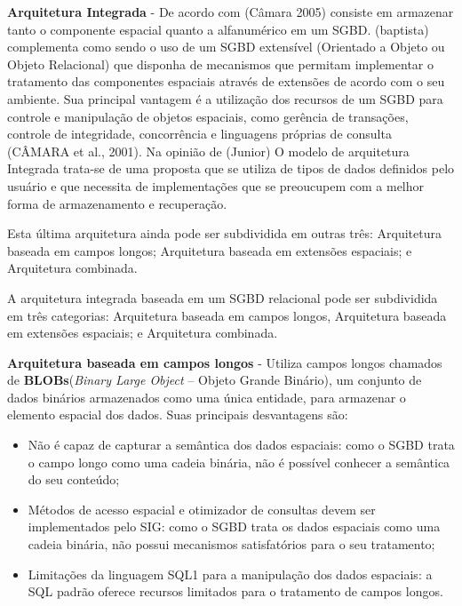 \documentclass[
	12pt,				%
    oneside,			%
	a4paper,			%
	english,			%
	french,				%
	spanish,			%
	brazil,				%
	]{abntex2}
\begin{document}
\textbf{Arquitetura Integrada} - De acordo com (Câmara 2005) consiste em armazenar tanto o componente espacial quanto a alfanumérico em um SGBD. (baptista) complementa como sendo o uso de um SGBD extensível (Orientado a Objeto ou Objeto Relacional) que disponha de mecanismos que permitam implementar o tratamento das componentes espaciais através de extensões de acordo com o seu ambiente. Sua principal vantagem é a utilização dos recursos de um SGBD para controle e manipulação de objetos espaciais, como gerência de transações, controle de integridade, concorrência e linguagens próprias de consulta (CÂMARA et al., 2001). Na opinião de (Junior) O modelo de arquitetura Integrada trata-se de uma proposta que se utiliza de tipos de dados definidos pelo usuário e que necessita de implementações que se preoucupem com a melhor forma de armazenamento e recuperação.

Esta última arquitetura ainda pode ser subdividida em outras três: Arquitetura baseada em campos longos; Arquitetura baseada em extensões espaciais; e Arquitetura combinada.

A arquitetura integrada baseada em um SGBD relacional pode ser subdividida em três categorias: Arquitetura baseada em campos longos, Arquitetura baseada em extensões espaciais; e Arquitetura combinada. 



\textbf{Arquitetura baseada em campos longos} - Utiliza campos longos chamados de \textbf{BLOBs}(\textit{Binary Large Object} – Objeto Grande Binário), um conjunto de dados binários armazenados como uma única entidade, para armazenar o elemento espacial dos dados.
 Suas principais desvantagens são:
 
 
\begin{itemize}
    \item Não é capaz de capturar a semântica dos dados espaciais: como o SGBD trata o campo longo como uma cadeia binária, não é possível conhecer a semântica do seu conteúdo;
    \item Métodos de acesso espacial e otimizador de consultas devem ser implementados pelo SIG: como o SGBD trata os dados espaciais como uma cadeia binária, não possui mecanismos satisfatórios para o seu tratamento;
    \item Limitações da linguagem SQL1 para a manipulação dos dados espaciais: a SQL padrão oferece recursos limitados para o tratamento de campos longos.

\end{itemize}
\end{document}
